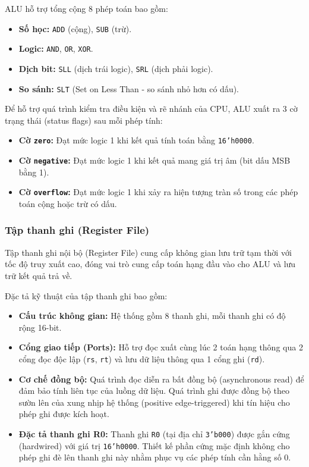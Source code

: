 \documentclass[11pt,a4paper]{article}
\theoremstyle{definition}
\theoremstyle{remark}
\begin{document}
	ALU hỗ trợ tổng cộng 8 phép toán bao gồm:
	\begin{itemize}
		\item \textbf{Số học:} \texttt{ADD} (cộng), \texttt{SUB} (trừ).
		\item \textbf{Logic:} \texttt{AND}, \texttt{OR}, \texttt{XOR}.
		\item \textbf{Dịch bit:} \texttt{SLL} (dịch trái logic), \texttt{SRL} (dịch phải logic).
		\item \textbf{So sánh:} \texttt{SLT} (Set on Less Than - so sánh nhỏ hơn có dấu).
	\end{itemize}
	
	Để hỗ trợ quá trình kiểm tra điều kiện và rẽ nhánh của CPU, ALU xuất ra 3 cờ trạng thái (status flags) sau mỗi phép tính:
	\begin{itemize}
		\item \textbf{Cờ \texttt{zero}:} Đạt mức logic 1 khi kết quả tính toán bằng \texttt{16'h0000}.
		\item \textbf{Cờ \texttt{negative}:} Đạt mức logic 1 khi kết quả mang giá trị âm (bit dấu MSB bằng 1).
		\item \textbf{Cờ \texttt{overflow}:} Đạt mức logic 1 khi xảy ra hiện tượng tràn số trong các phép toán cộng hoặc trừ có dấu.
	\end{itemize}
	
	\subsubsection{Tập thanh ghi (Register File)}
	Tập thanh ghi nội bộ (Register File) cung cấp không gian lưu trữ tạm thời với tốc độ truy xuất cao, đóng vai trò cung cấp toán hạng đầu vào cho ALU và lưu trữ kết quả trả về.
	
	Đặc tả kỹ thuật của tập thanh ghi bao gồm:
	\begin{itemize}
		\item \textbf{Cấu trúc không gian:} Hệ thống gồm 8 thanh ghi, mỗi thanh ghi có độ rộng 16-bit.
		\item \textbf{Cổng giao tiếp (Ports):} Hỗ trợ đọc xuất cùng lúc 2 toán hạng thông qua 2 cổng đọc độc lập (\texttt{rs}, \texttt{rt}) và lưu dữ liệu thông qua 1 cổng ghi (\texttt{rd}).
		\item \textbf{Cơ chế đồng bộ:} Quá trình đọc diễn ra bất đồng bộ (asynchronous read) để đảm bảo tính liên tục của luồng dữ liệu. Quá trình ghi được đồng bộ theo sườn lên của xung nhịp hệ thống (positive edge-triggered) khi tín hiệu cho phép ghi được kích hoạt.
		\item \textbf{Đặc tả thanh ghi R0:} Thanh ghi \texttt{R0} (tại địa chỉ \texttt{3'b000}) được gắn cứng (hardwired) với giá trị \texttt{16'h0000}. Thiết kế phần cứng mặc định không cho phép ghi đè lên thanh ghi này nhằm phục vụ các phép tính cần hằng số 0.
	\end{itemize}
	
\end{document}
